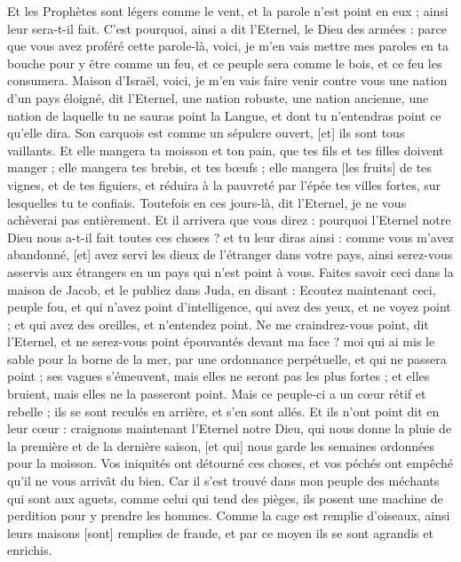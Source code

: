 \begin{multicols}{2}
Et les Prophètes sont légers comme le vent, et la parole n'est point en eux ; ainsi leur sera-t-il fait.
C'est pourquoi, ainsi a dit l'Eternel, le Dieu des armées : parce que vous avez proféré cette parole-là, voici, je m'en vais mettre mes paroles en ta bouche pour y être comme un feu, et ce peuple sera comme le bois, et ce feu les consumera.
Maison d'Israël, voici, je m'en vais faire venir contre vous une nation d'un pays éloigné, dit l'Eternel, une nation robuste, une nation ancienne, une nation de laquelle tu ne sauras point la Langue, et dont tu n'entendras point ce qu'elle dira.
Son carquois est comme un sépulcre ouvert, [et] ils sont tous vaillants.
Et elle mangera ta moisson et ton pain, que tes fils et tes filles doivent manger ; elle mangera tes brebis, et tes bœufs ; elle mangera [les fruits] de tes vignes, et de tes figuiers, et réduira à la pauvreté par l'épée tes villes fortes, sur lesquelles tu te confiais.
Toutefois en ces jours-là, dit l'Eternel, je ne vous achèverai pas entièrement.
Et il arrivera que vous direz : pourquoi l'Eternel notre Dieu nous a-t-il fait toutes ces choses ? et tu leur diras ainsi : comme vous m'avez abandonné, [et] avez servi les dieux de l'étranger dans votre pays, ainsi serez-vous asservis aux étrangers en un pays qui n'est point à vous.
Faites savoir ceci dans la maison de Jacob, et le publiez dans Juda, en disant :
Ecoutez maintenant ceci, peuple fou, et qui n'avez point d'intelligence, qui avez des yeux, et ne voyez point ; et qui avez des oreilles, et n'entendez point.
Ne me craindrez-vous point, dit l'Eternel, et ne serez-vous point épouvantés devant ma face ? moi qui ai mis le sable pour la borne de la mer, par une ordonnance perpétuelle, et qui ne passera point ; ses vagues s'émeuvent, mais elles ne seront pas les plus fortes ; et elles bruient, mais elles ne la passeront point.
Mais ce peuple-ci a un cœur rétif et rebelle ; ils se sont reculés en arrière, et s'en sont allés.
Et ils n'ont point dit en leur cœur : craignons maintenant l'Eternel notre Dieu, qui nous donne la pluie de la première et de la dernière saison, [et qui] nous garde les semaines ordonnées pour la moisson.
Vos iniquités ont détourné ces choses, et vos péchés ont empêché qu'il ne vous arrivât du bien.
Car il s'est trouvé dans mon peuple des méchants qui sont aux aguets, comme celui qui tend des pièges, ils posent une machine de perdition pour y prendre les hommes.
Comme la cage est remplie d'oiseaux, ainsi leurs maisons [sont] remplies de fraude, et par ce moyen ils se sont agrandis et enrichis.

\end{multicols}
